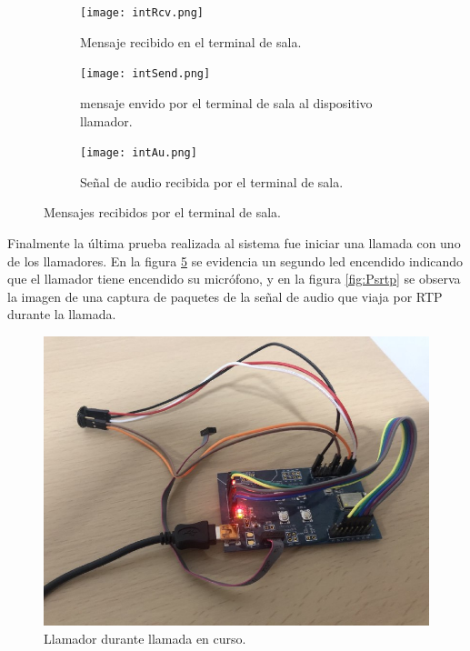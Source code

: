 \begin{figure}[htpb]
	\centering
   	\begin{subfigure}[b]{1\textwidth}
   		\centering
      	\texttt{[image: intRcv.png]}
      	\caption{Mensaje recibido en el terminal de sala.}
      	\label{fig:PmrcvA}
   	\end{subfigure}%
   	\newline
   	\begin{subfigure}[b]{1\textwidth}
   		\centering
      	\texttt{[image: intSend.png]}
      	\caption{mensaje envido por el terminal de sala al dispositivo llamador.}
      	\label{fig:PmrcvB}
   	\end{subfigure}%
   	\newline
   	\begin{subfigure}[b]{1\textwidth}
   		\centering
      	\texttt{[image: intAu.png]}
      	\caption{Señal de audio recibida por el terminal de sala.}
      	\label{fig:PmrcvC}
   	\end{subfigure}%
	\caption{Mensajes recibidos por el terminal de sala.}
	\label{fig:Pmrcv}
\end{figure}

Finalmente la última prueba realizada al sistema fue iniciar una llamada con uno de los llamadores. En la figura \ref{fig:Pmicon} se evidencia un segundo led encendido indicando que el llamador tiene encendido su micrófono, y en la figura \ref{fig:Psrtp} se observa la imagen de una captura de paquetes de la señal de audio que viaja por RTP durante la llamada.

\begin{figure}[htpb]
	\centering
	\includegraphics[scale=0.45]{./Figures/callCtrue.jpeg}	
	\caption{Llamador durante llamada en curso.}
	\label{fig:Pmicon}
\end{figure}

